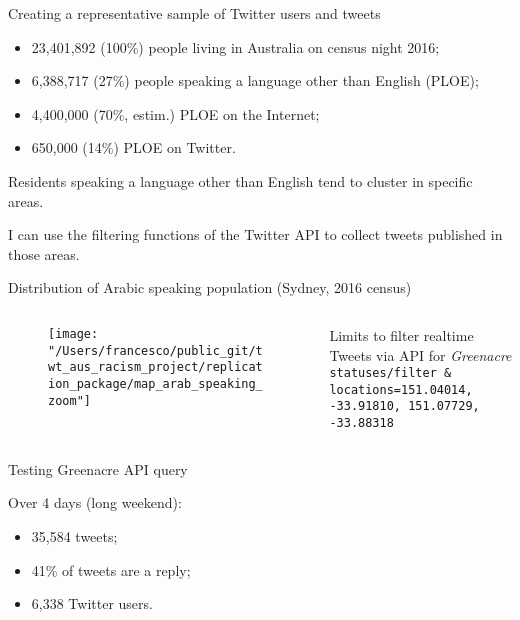 \documentclass[serif, aspectratio=169]{beamer}
\begin{document}
\begin{frame}
{Creating a representative sample of Twitter users and tweets}

\begin{itemize}
\item 23,401,892 (100\%) people living in Australia on census night 2016;
\item 6,388,717 (27\%) people speaking a language other than English (PLOE);
\item 4,400,000 (70\%, estim.) PLOE on the Internet;
\item 650,000 (14\%) PLOE on Twitter.
\end{itemize}

Residents speaking a language other than English tend to cluster in specific areas.

I can use the filtering functions of the Twitter API to collect tweets published in those areas.  

\end{frame}

\begin{frame}[fragile]
{Distribution of Arabic speaking population (Sydney, 2016 census)}

\begin{columns}
\begin{column}{0.7\textwidth}
\begin{figure}
\texttt{[image: "/Users/francesco/public\_git/twt\_aus\_racism\_project/replication\_package/map\_arab\_speaking\_zoom"]}
\end{figure}
\end{column}
\begin{column}{0.3\textwidth}
{\scriptsize Limits to filter realtime Tweets via API for \textit{Greenacre} \\ \tt{statuses/filter} \& \tt{locations=151.04014, -33.91810, 151.07729, -33.88318}}
\end{column}
\end{columns}

\end{frame}

\begin{frame}
{Testing Greenacre API query}

Over 4 days (long weekend):

\begin{itemize}

\item 35,584 tweets;
\item 41\% of tweets are a reply;
\item 6,338 Twitter users.

\end{itemize}

\end{frame}
\end{document}
